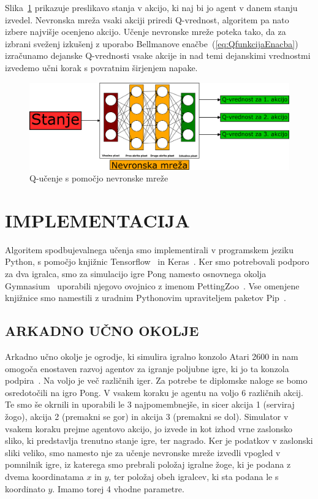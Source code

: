 \documentclass[cover]{thesis}
\begin{document}
Slika~\ref{fig:deepQLearning} prikazuje preslikavo stanja v akcijo, ki naj bi jo agent v danem stanju izvedel. Nevronska mreža vsaki akciji priredi Q-vrednost, algoritem pa nato izbere najvišje ocenjeno akcijo. Učenje nevronske mreže poteka tako, da za izbrani sveženj izkušenj z uporabo Bellmanove enačbe~(\ref{eq:QfunkcijaEnacba}) izračunamo dejanske Q-vrednosti vsake akcije in nad temi dejanskimi vrednostmi izvedemo učni korak s povratnim širjenjem napake.

\begin{figure}[ht]
    \includegraphics[width=\textwidth]{deepQLearning.png}
    \caption{Q-učenje s pomočjo nevronske mreže}\label{fig:deepQLearning}
\end{figure}

\chapter{IMPLEMENTACIJA}

Algoritem spodbujevalnega učenja smo implementirali v programskem jeziku Python, s pomočjo knjižnic Tensorflow~\cite{tensorflow2015} in Keras~\cite{chollet2015keras}. Ker smo potrebovali podporo za dva igralca, smo za simulacijo igre Pong namesto osnovnega okolja Gymnasium~\cite{towers_gymnasium_2023} uporabili njegovo ovojnico z imenom PettingZoo~\cite{Terry_PettingZoo_Gym_for}. Vse omenjene knjižnice smo namestili z uradnim Pythonovim upraviteljem paketov Pip~\cite{pypi}.

\section{ARKADNO UČNO OKOLJE}

Arkadno učno okolje je ogrodje, ki simulira igralno konzolo Atari 2600 in nam omogoča enostaven razvoj agentov za igranje poljubne igre, ki jo ta konzola podpira~\cite{bellemare2013arcade}. Na voljo je več različnih iger. Za potrebe te diplomske naloge se bomo osredotočili na igro Pong. V vsakem koraku je agentu na voljo 6 različnih akcij. Te smo še okrnili in uporabili le 3 najpomembnejše, in sicer akcija 1 (serviraj žogo), akcija 2 (premakni se gor) in akcija 3 (premakni se dol). Simulator v vsakem koraku prejme agentovo akcijo, jo izvede in kot izhod vrne zaslonsko sliko, ki predstavlja trenutno stanje igre, ter nagrado. Ker je podatkov v zaslonski sliki veliko, smo namesto nje za učenje nevronske mreže izvedli vpogled v pomnilnik igre, iz katerega smo prebrali položaj igralne žoge, ki je podana z dvema koordinatama $x$ in $y$, ter položaj obeh igralcev, ki sta podana le s koordinato $y$. Imamo torej 4 vhodne parametre.
\end{document}
